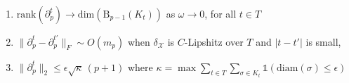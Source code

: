 \documentclass[10pt]{article}
\newcommand{\+}{%
	\raisebox{0.18ex}{\scaleobj{0.55}{+}}
}
\newtheorem{definition}{Definition}
\begin{document}
\begin{enumerate}
	\item $\mathrm{rank}(\partial_p^t) \to \mathrm{dim}(\mathrm{B}_{p-1}(K_t))$ as $\omega \to 0$, for all $t \in T$ 
	\item $\lVert \partial_p^t - \partial_p^{t'} \rVert_F \sim O(m_p)$ when $\delta_\mathcal{X}$ is $C$-Lipshitz over $T$ and $\lvert t - t' \rvert$ is small,
	\item $\lVert \partial_p^t \rVert_{2} \leq \epsilon \sqrt{\kappa} \, (p+1)$ where $\kappa = \max \sum\limits_{t \in T}\sum\limits_{\sigma \in K_t}\mathds{1}(\mathrm{diam}(\sigma) \leq \epsilon)$
\end{enumerate}
\end{document}
